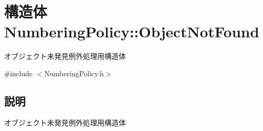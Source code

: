 \section{構造体 NumberingPolicy::ObjectNotFound}
\label{structNumberingPolicy_1_1ObjectNotFound}


オブジェクト未発見例外処理用構造体  




{\ttfamily \#include $<$NumberingPolicy.h$>$}



\subsection{説明}
オブジェクト未発見例外処理用構造体 